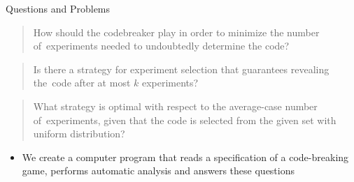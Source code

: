 \documentclass[final]{beamer}
\begin{document}
\begin{frame}{}
\begin{columns}[t, totalwidth=\textwidth]
\begin{column}{.47\textwidth}
    \begin{block}{Questions and Problems}
      \bigskip
      \begin{quote}
      How should the codebreaker play in order to minimize the number of~experiments needed to undoubtedly determine the code?
      \end{quote}
      \begin{quote}
      Is there a strategy for experiment selection that guarantees revealing the~code after at most $k$ experiments?
      \end{quote}
      \begin{quote}
      What strategy is optimal with respect to the average-case number of~experiments, given that the code is selected from the given set with uniform distribution?
      \end{quote}


      \begin{itemize}
      \item We create a computer program that reads a specification of a code-breaking game, performs automatic analysis and answers these questions
      \end{itemize}
      \vspace{24mm}
    \end{block}

  \end{column}
  \end{columns}


\end{frame}
\end{document}
